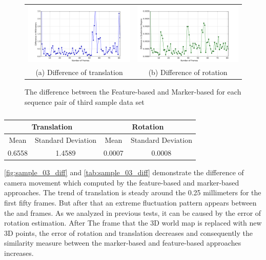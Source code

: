 \begin{figure}[H]
\begin{tabular}{cc}
  \includegraphics[width=80mm]{figures/diff_600/graph_translation} &  \includegraphics[width=80mm]{figures/diff_600/graph_rotation} \\
(a) Difference of translation & (b) Difference of rotation \\[6pt]
\end{tabular}
\caption{The difference between the Feature-based and Marker-based for each sequence pair of third sample data set}\label{fig:sample_03_diff}
\end{figure}

\begin{table}[H]
\centering
  \begin{tabular}{| c | c | c | c |}
      \hline
      \multicolumn{2}{|c|}{Translation} & \multicolumn{2}{c}{Rotation} \\ \hline
       Mean & Standard Deviation & Mean & Standard Deviation \\ \hline
      0.6558 & 1.4589 & 0.0007 & 0.0008 \\ \hline
  \end{tabular}
  \caption{} \label{tab:sample_03_diff}
\end{table}

\autoref{fig:sample_03_diff} and \autoref{tab:sample_03_diff} demonstrate the difference of camera movement which computed by the feature-based and marker-based approaches. The trend of translation is steady around the 0.25 millimeters for the first fifty frames. But after that an extreme fluctuation pattern appears between the  and  frames. As we analyzed in previous tests, it can be caused by the error of rotation estimation. After The  frame that the 3D world map is replaced with new 3D points, the error of rotation and translation decreases and consequently the similarity measure between the marker-based and feature-based approaches increases.

